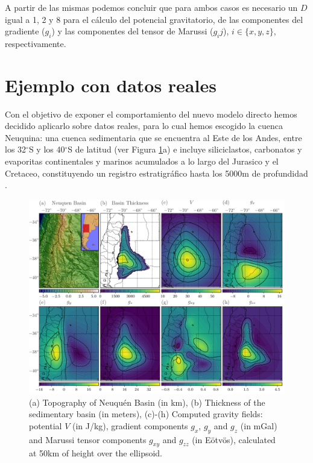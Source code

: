 \documentclass[a4paper,10pt]{article}
\begin{document}
A partir de las mismas podemos concluir que para ambos casos es necesario un $D$ igual a 1, 2 y 8 para el cálculo del potencial gravitatorio, de las componentes del gradiente ($g_i$) y las componentes del tensor de Marussi ($g_ij$), $i \in \{ x, y, z\}$, respectivamente.




\section{Ejemplo con datos reales}

Con el objetivo de exponer el comportamiento del nuevo modelo directo hemos decidido aplicarlo sobre datos reales, para lo cual hemos escogido la cuenca Neuquina: una cuenca sedimentaria que se encuentra al Este de los Andes, entre los 32$^\circ$S y los 40$^\circ$S de latitud (ver Figura \ref{fig:neuquen-basin}a) e incluye siliciclastos, carbonatos y evaporitas continentales y marinos acumulados a lo largo del Jurasico y el Cretaceo, constituyendo un registro estratigráfico hasta los 5000m de profundidad \citep{Howell2005}.


\begin{figure}
\centering
\includegraphics[width=\linewidth]{../manuscript/figures/neuquen-basin.pdf}
\caption{(a) Topography of Neuqu\'en Basin (in km),
         (b) Thickness of the sedimentary basin (in meters),
         (c)-(h) Computed gravity fields: potential $V$ (in J/kg), gradient components $g_x$, $g_y$ and $g_z$ (in mGal) and Marussi tensor components $g_{xy}$ and $g_{zz}$ (in Eötvös), calculated at 50km of height over the ellipsoid.}
\label{fig:neuquen-basin}
\end{figure}
\end{document}
